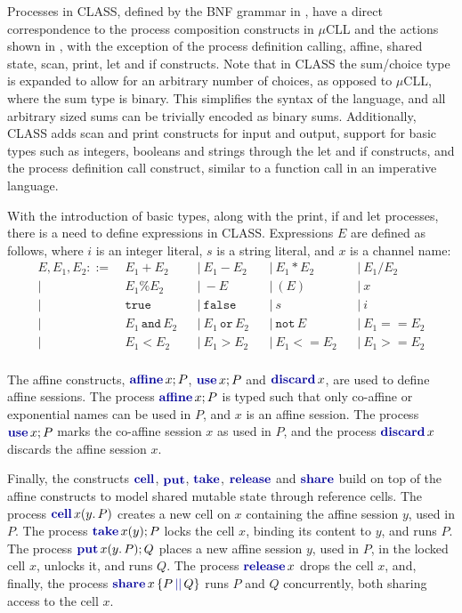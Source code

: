 Processes in \ac{CLASS}, defined by the BNF grammar in , have a direct correspondence to the process composition constructs in $\mu$CLL and the actions shown in , with the exception of the process definition calling, affine, shared state, scan, print, let and if constructs. Note that in \ac{CLASS} the sum/choice type is expanded to allow for an arbitrary number of choices, as opposed to $\mu$CLL, where the sum type is binary. This simplifies the syntax of the language, and all arbitrary sized sums can be trivially encoded as binary sums. Additionally, \ac{CLASS} adds scan and print constructs for input and output, support for basic types such as integers, booleans and strings through the let and if constructs, and the process definition call construct, similar to a function call in an imperative language.

With the introduction of basic types, along with the print, if and let processes, there is a need to define expressions in \ac{CLASS}. Expressions $E$ are defined as follows, where $i$ is an integer literal, $s$ is a string literal, and $x$ is a channel name:
\[\begin{aligned}
    E, E_1, E_2 ::=\ & E_1 + E_2    & & |\ E_1 - E_2 & & |\ E_1 * E_2  & & |\ E_1 / E_2 \\
                  |\ & E_1 \% E_2   & & |\ -E        & & |\ (E)        & & |\ x \\
                  |\ & \texttt{true} & & |\ \texttt{false} & & |\ s          & & |\ i \\
                  |\ & E_1\,\texttt{and}\,E_2 & & |\ E_1\,\texttt{or}\,E_2 & & |\ \texttt{not}\,E & & |\ E_1 == E_2 \\
                    |\ & E_1 < E_2   & & |\ E_1 > E_2 & & |\ E_1 <= E_2 & & |\ E_1 >= E_2 \\ 
\end{aligned}\]

The affine constructs, $\affinec{x}P$, $\usec{x}P$ and $\discardc{x}$, are used to define affine sessions. The process $\affinec{x}P$ is typed such that only co-affine or exponential names can be used in $P$, and $x$ is an affine session. The process $\usec{x}P$ marks the co-affine session $x$ as used in $P$, and the process $\discardc{x}$ discards the affine session $x$.

Finally, the constructs $\cellp$, $\putp$, $\takep$, $\releasep$ and $\sharep$ build on top of the affine constructs to model shared mutable state through reference cells. The process $\cellc{x}{y}P$ creates a new cell on $x$ containing the affine session $y$, used in $P$. The process $\takec{x}{y}P$ locks the cell $x$, binding its content to $y$, and runs $P$. The process $\putc{x}{y}{P}Q$ places a new affine session $y$, used in $P$, in the locked cell $x$, unlocks it, and runs $Q$. The process $\releasec{x}$ drops the cell $x$, and, finally, the process $\sharec{x}{P}{Q}$ runs $P$ and $Q$ concurrently, both sharing access to the cell $x$.

